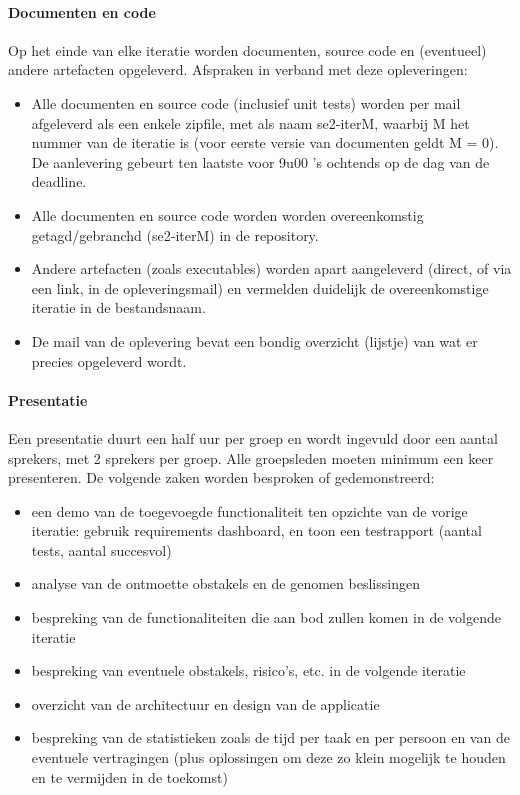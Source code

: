 \paragraph{Documenten en code} 
Op het einde van elke iteratie worden documenten, source code en (eventueel) andere artefacten opgeleverd.
Afspraken in verband met deze opleveringen: 

\begin{itemize}
\item Alle documenten en source code (inclusief unit tests) worden per mail afgeleverd als een
enkele zipfile, met als naam se2-iterM, waarbij M het nummer van de iteratie is (voor
eerste versie van documenten geldt M = 0). De aanlevering gebeurt ten laatste voor 9u00 ’s
ochtends op de dag van de deadline.
\item Alle documenten en source code worden worden overeenkomstig getagd/gebranchd (se2-iterM)
in de repository.
\item Andere artefacten (zoals executables) worden apart aangeleverd (direct, of via een link, in de
opleveringsmail) en vermelden duidelijk de overeenkomstige iteratie in de bestandsnaam.
\item De mail van de oplevering bevat een bondig overzicht (lijstje) van wat er precies opgeleverd
wordt.
\end{itemize}

\paragraph{Presentatie}
Een presentatie duurt een half uur per groep en wordt ingevuld door een aantal sprekers, met 2 sprekers
per groep. Alle groepsleden moeten minimum een keer presenteren. De volgende zaken worden
besproken of gedemonstreerd:

\begin{itemize}
\item een demo van de toegevoegde functionaliteit ten opzichte van de vorige iteratie: gebruik requirements
dashboard, en toon een testrapport (aantal tests, aantal succesvol)
\item analyse van de ontmoette obstakels en de genomen beslissingen
\item bespreking van de functionaliteiten die aan bod zullen komen in de volgende iteratie
\item bespreking van eventuele obstakels, risico’s, etc. in de volgende iteratie
\item overzicht van de architectuur en design van de applicatie
\item bespreking van de statistieken zoals de tijd per taak en per persoon en van de eventuele vertragingen
(plus oplossingen om deze zo klein mogelijk te houden en te vermijden in de toekomst)
\end{itemize}

